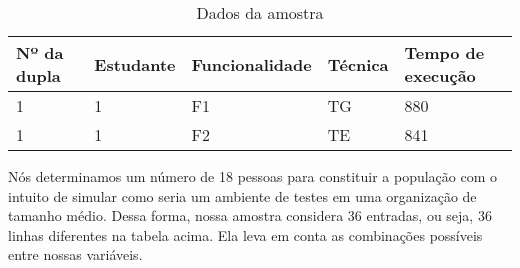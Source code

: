 
\begin{table}[h]\tiny
    \caption{Dados da amostra}
    \centering
    \begin{tabular}{|l|l|l|l|l|}
    \addlinespace
    \hline
    {\bf Nº da dupla}  & {\bf Estudante} & {\bf Funcionalidade} & {\bf Técnica}
    & {\bf Tempo de execução}\\ \hline 1 & 1 & F1 & TG & 880\\ \hline
    1 & 1 & F2 & TE & 841\\ \hline
    \end{tabular}
  \label{tab:amostra}
\end{table}

Nós determinamos um número de 18 pessoas para constituir a população com o
intuito de simular como seria um ambiente de testes em uma organização de
tamanho médio. Dessa forma, nossa amostra considera 36 entradas, ou seja, 36
linhas diferentes na tabela acima. Ela leva em conta as combinações possíveis
entre nossas variáveis.

